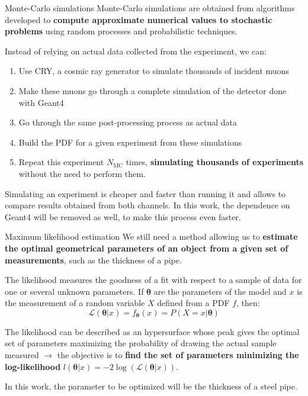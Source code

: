 \documentclass[8 pt]{beamer}
\begin{document}
\begin{frame}{Monte-Carlo simulations}
\justifying
Monte-Carlo simulations are obtained from algorithms developed to \textbf{compute approximate numerical values to stochastic problems} using random processes and probabilistic techniques. \vfill

Instead of relying on actual data collected from the experiment, we can:
\begin{enumerate}
\justifying
\item Use CRY, a cosmic ray generator to simulate thousands of incident muons
\item Make these muons go through a complete simulation of the detector done with Geant4
\item Go through the same post-processing process as actual data
\item Build the PDF for a given experiment from these simulations
\item Repeat this experiment $N_\text{MC}$ times, \textbf{simulating thousands of experiments} without the need to perform them.
\end{enumerate} \vfill

Simulating an experiment is cheaper and faster than running it and allows to compare results obtained from both channels. In this work, the dependence on Geant4 will be removed as well, to make this process even faster. \vfill
\end{frame}

\begin{frame}{Maximum likelihood estimation}
\justifying
We still need a method allowing us to \textbf{estimate the optimal geometrical parameters of an object from a given set of measurements}, such as the thickness of a pipe. \vfill

\begin{exampleblock}{}
\justifying 
The likelihood measures the goodness of a fit with respect to a sample of data for one or several unknown parameters. If $\bm \theta$ are the parameters of the model and $x$ is the measurement of a random variable $X$ defined from a PDF $f$, then:
\begin{equation*}
\label{eq:likelihood}
\mathcal{L}(\bm \theta | x) = f_{\bm \theta}(x) = P(X = x | \bm \theta)
\end{equation*}
 \end{exampleblock} \vfill

The likelihood can be described as an hypersurface whose peak gives the optimal set of parameters maximizing the probability of drawing the actual sample measured $\rightarrow$ the objective is to \textbf{find the set of parameters minimizing the log-likelihood} $l(\bm \theta | x) = -2 \log(\mathcal{L}(\bm \theta | x))$. \vfill

In this work, the parameter to be optimized will be the thickness of a steel pipe. \vfill
\end{frame}
\end{document}
